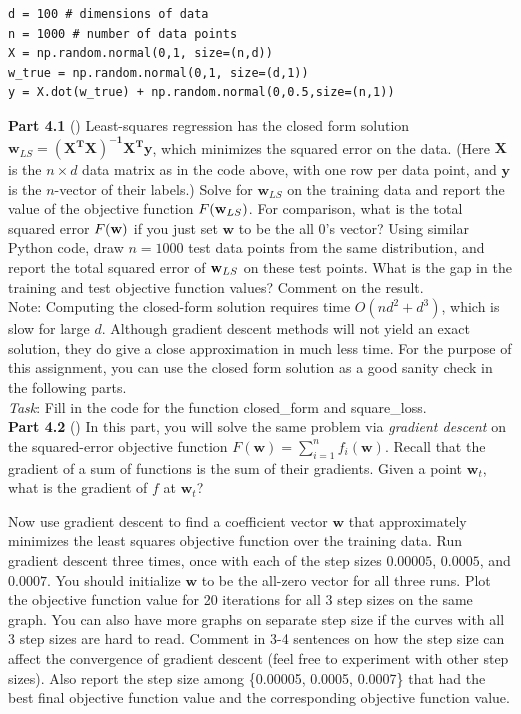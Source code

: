 \begin{verbatim}
d = 100 # dimensions of data
n = 1000 # number of data points
X = np.random.normal(0,1, size=(n,d))
w_true = np.random.normal(0,1, size=(d,1))
y = X.dot(w_true) + np.random.normal(0,0.5,size=(n,1))
\end{verbatim}

\textbf{Part 4.1} () Least-squares regression has the closed form solution $\textbf{w}_{LS} =
\mathbf{(X^TX)^{-1}X^Ty}$, which minimizes the squared error on the
data. 
(Here $\mathbf{X}$ is the $n \times d$ data matrix as in the code
above, with one row per data point, and $\mathbf{y}$ is the $n$-vector
of their labels.)
Solve for $\textbf{w}_{LS}$ on the training data and report the value of the objective function $F(\mathbf{w}_{LS})$.  For comparison, what is the 
total squared error $F(\mathbf{w})$ if you just set $\textbf{w}$ to be the all 0's vector? Using similar Python code, draw $n=1000$ test data points from the same distribution, and report the total squared error of $\mathbf{w}_{LS}$ on these test points. What is the gap in the training and test objective function values? Comment on the result. \\

Note: Computing the closed-form solution requires time
$O(nd^2 + d^3)$, which is slow for large $d$. Although gradient
descent methods will not yield an exact solution, they do give a
close approximation in much less time. For the purpose of this
assignment, you can use the closed form solution as a good sanity
check in the following parts.\\

\noindent \emph{Task}: Fill in the code for the function \colorbox{Gainsboro!60!Lavender}{closed\_form} and \colorbox{Gainsboro!60!Lavender}{square\_loss}. \\

\textbf{Part 4.2} () In this part, you will solve the same problem via
  \emph{gradient descent} on the squared-error objective function
  $F(\textbf{w})=\sum_{i=1}^n f_i(\textbf{w})$.  Recall that the gradient of a
  sum of functions is the sum of their gradients.  Given a point
  $\textbf{w}_t$, what is the gradient of $f$ at $\textbf{w}_t$?

  Now use gradient descent to find a coefficient vector $\textbf{w}$ that 
approximately minimizes the
  least squares objective function over the training data. Run gradient descent
  three times, once with each of the step sizes
  $0.00005$, $0.0005$, and $0.0007$. You should initialize $\textbf{w}$ to be
  the all-zero vector for all three runs. Plot the objective function
  value for 20 iterations for all 3 step sizes on the same
  graph. You can also have more graphs on separate step size if the curves with all 3 step sizes are hard to read. Comment in 3-4 sentences on how the step size can affect the
  convergence of gradient descent (feel free to experiment with other
  step sizes). Also report the step size among \{0.00005, 0.0005, 0.0007\} that had the best final
  objective function value and the corresponding objective function value.\\

